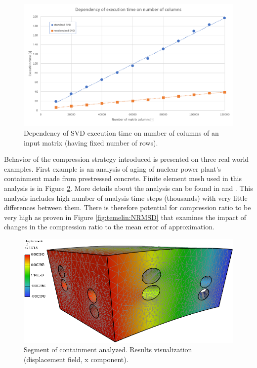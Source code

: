\begin{figure}[H]
\centering\includegraphics[width=\textwidth]{figures/executionTime_varyingColumns}
\caption{Dependency of SVD execution time on number of columns of an input matrix (having fixed number of rows).}
\label{fig:ExeTime_columns}
\end{figure}

Behavior of the compression strategy introduced is presented on three real world examples. First example is an analysis of aging of nuclear power plant's containment made from prestressed concrete. Finite element mesh used in this analysis is in Figure \ref{fig:temelin:mesh}. More details about the analysis can be found in \cite{Kruis2012} and \cite{Koudelka2009}. This analysis includes high number of analysis time steps (thousands) with very little differences between them. There is therefore potential for compression ratio to be very high as proven in Figure \ref{fig:temelin:NRMSD} that examines the impact of changes in the compression ratio to the mean error of approximation.

\begin{figure}[H]
\centering\includegraphics[width=\textwidth]{figures/temelin_screenshot}
\caption{Segment of containment analyzed. Results visualization (displacement field, x component).}
\label{fig:temelin:mesh}
\end{figure}

